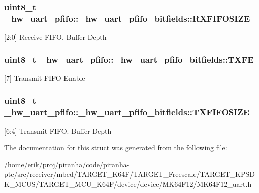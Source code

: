\subsubsection[{\texorpdfstring{R\+X\+F\+I\+F\+O\+S\+I\+ZE}{RXFIFOSIZE}}]{\setlength{\rightskip}{0pt plus 5cm}uint8\+\_\+t \+\_\+hw\+\_\+uart\+\_\+pfifo\+::\+\_\+hw\+\_\+uart\+\_\+pfifo\+\_\+bitfields\+::\+R\+X\+F\+I\+F\+O\+S\+I\+ZE}\hypertarget{struct__hw__uart__pfifo_1_1__hw__uart__pfifo__bitfields_aa52731290b0688aebd0bb8705c7c7d68}{}\label{struct__hw__uart__pfifo_1_1__hw__uart__pfifo__bitfields_aa52731290b0688aebd0bb8705c7c7d68}
\mbox{[}2\+:0\mbox{]} Receive F\+I\+FO. Buffer Depth 
\subsubsection[{\texorpdfstring{T\+X\+FE}{TXFE}}]{\setlength{\rightskip}{0pt plus 5cm}uint8\+\_\+t \+\_\+hw\+\_\+uart\+\_\+pfifo\+::\+\_\+hw\+\_\+uart\+\_\+pfifo\+\_\+bitfields\+::\+T\+X\+FE}\hypertarget{struct__hw__uart__pfifo_1_1__hw__uart__pfifo__bitfields_ab2326d1f690556d5c949106a34cdb1a4}{}\label{struct__hw__uart__pfifo_1_1__hw__uart__pfifo__bitfields_ab2326d1f690556d5c949106a34cdb1a4}
\mbox{[}7\mbox{]} Transmit F\+I\+FO Enable 
\subsubsection[{\texorpdfstring{T\+X\+F\+I\+F\+O\+S\+I\+ZE}{TXFIFOSIZE}}]{\setlength{\rightskip}{0pt plus 5cm}uint8\+\_\+t \+\_\+hw\+\_\+uart\+\_\+pfifo\+::\+\_\+hw\+\_\+uart\+\_\+pfifo\+\_\+bitfields\+::\+T\+X\+F\+I\+F\+O\+S\+I\+ZE}\hypertarget{struct__hw__uart__pfifo_1_1__hw__uart__pfifo__bitfields_a4d32ae7c22923275548ef29be73cee30}{}\label{struct__hw__uart__pfifo_1_1__hw__uart__pfifo__bitfields_a4d32ae7c22923275548ef29be73cee30}
\mbox{[}6\+:4\mbox{]} Transmit F\+I\+FO. Buffer Depth 

The documentation for this struct was generated from the following file\+:\begin{DoxyCompactItemize}
\item 
/home/erik/proj/piranha/code/piranha-\/ptc/src/receiver/mbed/\+T\+A\+R\+G\+E\+T\+\_\+\+K64\+F/\+T\+A\+R\+G\+E\+T\+\_\+\+Freescale/\+T\+A\+R\+G\+E\+T\+\_\+\+K\+P\+S\+D\+K\+\_\+\+M\+C\+U\+S/\+T\+A\+R\+G\+E\+T\+\_\+\+M\+C\+U\+\_\+\+K64\+F/device/device/\+M\+K64\+F12/M\+K64\+F12\+\_\+uart.\+h\end{DoxyCompactItemize}

